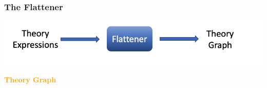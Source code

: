 \documentclass[t,10pt,numbers,fleqn,usenames,xcolor=dvipsnames]{beamer}
\begin{document}
\begin{frame}[fragile] 
\frametitle{The Flattener} 

\begin{center}
\includegraphics[scale=0.2]{figures/flattener.png}
\end{center}

\textcolor{Orange}{\textbf{Theory Graph}}


\end{frame}
\end{document}
